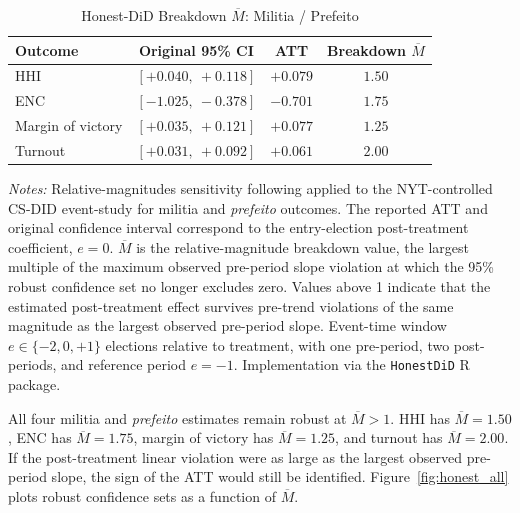 \documentclass[11pt]{article}
\newcommand{\tabnotes}[1]{\par\vspace{3pt}\noindent\begin{minipage}{\linewidth}\footnotesize #1\end{minipage}}
\begin{document}
\begin{table}[H]
\centering
\caption{Honest-DiD Breakdown $\overline{M}$: Militia / Prefeito}\label{tab:honest_did}
\footnotesize
\begin{tabular}{@{}lccc@{}}
\toprule
Outcome            & Original 95\% CI     & ATT         & Breakdown $\overline{M}$ \\
\midrule
HHI                & $[+0.040,\ +0.118]$ & $+0.079$    & $1.50$ \\
ENC                & $[-1.025,\ -0.378]$ & $-0.701$    & $1.75$ \\
Margin of victory  & $[+0.035,\ +0.121]$ & $+0.077$    & $1.25$ \\
Turnout            & $[+0.031,\ +0.092]$ & $+0.061$    & $2.00$ \\
\bottomrule
\end{tabular}
\tabnotes{\textit{Notes:} Relative-magnitudes sensitivity following \citet{rambachan2023honest} applied to the NYT-controlled CS-DID event-study for militia and \emph{prefeito} outcomes. The reported ATT and original confidence interval correspond to the entry-election post-treatment coefficient, $e=0$. $\overline{M}$ is the relative-magnitude breakdown value, the largest multiple of the maximum observed pre-period slope violation at which the 95\% robust confidence set no longer excludes zero. Values above 1 indicate that the estimated post-treatment effect survives pre-trend violations of the same magnitude as the largest observed pre-period slope. Event-time window $e \in \{-2, 0, +1\}$ elections relative to treatment, with one pre-period, two post-periods, and reference period $e = -1$. Implementation via the \texttt{HonestDiD} R package.}
\end{table}

All four militia and \emph{prefeito} estimates remain robust at $\overline{M} > 1$. HHI has $\overline{M} = 1.50$, ENC has $\overline{M} = 1.75$, margin of victory has $\overline{M} = 1.25$, and turnout has $\overline{M} = 2.00$. If the post-treatment linear violation were as large as the largest observed pre-period slope, the sign of the ATT would still be identified. Figure~\ref{fig:honest_all} plots robust confidence sets as a function of $\overline{M}$.
\end{document}

